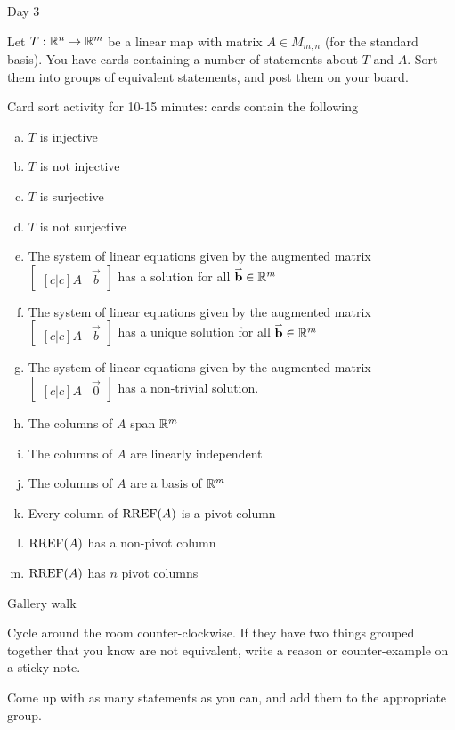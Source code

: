 
\begin{applicationActivities}{Day 3}

\begin{activity}
Let $T: \mathbb{R}^n \rightarrow \mathbb{R}^m$ be a linear map with matrix $A \in M_{m,n}$ (for the standard basis).  You have cards containing a number of statements about $T$ and $A$.  Sort them into groups of equivalent statements, and post them on your board.

\begin{TBLnote}Card sort activity for 10-15 minutes: cards contain the following
\begin{enumerate}[(a)]
\item $T$ is injective
\item $T$ is not injective
\item $T$ is surjective
\item $T$ is not surjective
\item The system of linear equations given by the augmented matrix $\begin{bmatrix}[c|c]A & \vec{b} \end{bmatrix}$ has a solution for all $\mathbf{\accentset{\rightharpoonup}{b}} \in \mathbb{R}^m$
\item The system of linear equations given by the augmented matrix $\begin{bmatrix}[c|c]A & \vec{b} \end{bmatrix}$ has a unique solution for all $\mathbf{\accentset{\rightharpoonup}{b}} \in \mathbb{R}^m$
\item The system of linear equations given by the augmented matrix $\begin{bmatrix}[c|c] A & \vec{0} \end{bmatrix}$ has a non-trivial solution.
\item The columns of $A$ span $\mathbb{R}^m$
\item The columns of $A$ are linearly independent
\item The columns of $A$ are a basis of $\mathbb{R}^m$
\item Every column of $\operatorname{RREF}(A)$ is a pivot column
\item $\operatorname{RREF}(A)$ has a non-pivot column
\item $\operatorname{RREF}(A)$ has $n$ pivot columns
\end{enumerate}
\end{TBLnote}
\end{activity}

\begin{activity}
\begin{TBLnote}Gallery walk \end{TBLnote}
Cycle around the room counter-clockwise.  If they have two things grouped together that you know are not equivalent, write a reason or counter-example on a sticky note.
\end{activity}

\begin{activity}
Come up with as many statements as you can, and add them to the appropriate group.
\end{activity}

\end{applicationActivities}
